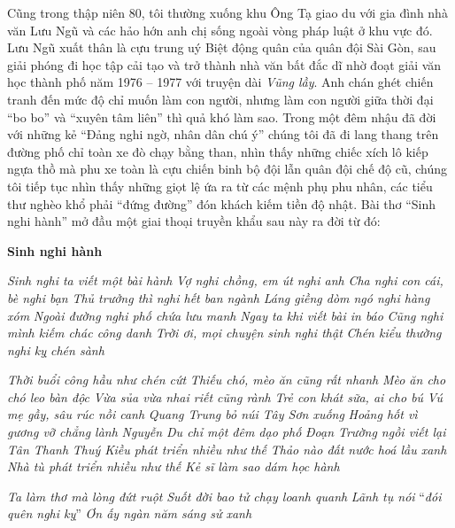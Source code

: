 \documentclass[../main.tex]{subfiles}
\begin{document}
\begin{multicols}{2}
Cũng trong thập niên 80, tôi thường xuống khu Ông Tạ giao du với gia đình nhà văn Lưu Ngũ và các hảo hớn anh chị sống ngoài vòng pháp luật ở khu vực đó. Lưu Ngũ xuất thân là cựu trung uý Biệt động quân của quân đội Sài Gòn, sau giải phóng đi học tập cải tạo và trở thành nhà văn bất đắc dĩ nhờ đoạt giải văn học thành phố năm 1976 – 1977 với truyện dài \textit{Vũng lầy}. Anh chán ghét chiến tranh đến mức độ chỉ muốn làm con người, nhưng làm con người giữa thời đại “bo bo” và “xuyên tâm liên” thì quả khó làm sao. Trong một đêm nhậu đã đời với những kẻ “Ðảng nghi ngờ, nhân dân chú ý” chúng tôi đã đi lang thang trên đường phố chỉ toàn xe đò chạy bằng than, nhìn thấy những chiếc xích lô kiếp ngựa thồ mà phu xe toàn là cựu chiến binh bộ đội lẫn quân đội chế độ cũ, chúng tôi tiếp tục nhìn thấy những giọt lệ ứa ra từ các mệnh phụ phu nhân, các tiểu thư nghèo khổ phải “đứng đường” đón khách kiếm tiền độ nhật. Bài thơ “Sinh nghi hành” mở đầu một giai thoại truyền khẩu sau này ra đời từ đó: 
\begin{blockquote}
 
\textbf{Sinh nghi hành} 
        
\textit{Sinh nghi ta viết một bài hành}        
\textit{Vợ nghi chồng, em út nghi anh}        
\textit{Cha nghi con cái, bè nghi bạn}        
\textit{Thủ trưởng thì nghi hết ban ngành}        
\textit{Láng giềng dòm ngó nghi hàng xóm}        
\textit{Ngoài đường nghi phố chứa lưu manh}        
\textit{Ngay ta khi viết bài in báo}        
\textit{Cũng nghi mình kiếm chác công danh}        
\textit{Trời ơi, mọi chuyện sinh nghi thật} 
\textit{Chén kiểu thường nghi kỵ chén sành} 
        
\textit{Thời buổi công hầu như chén cứt}        
\textit{Thiếu chó, mèo ăn cũng rất nhanh}        
\textit{Mèo ăn cho chó leo bàn độc}        
\textit{Vừa sủa vừa nhai riết cũng rành}        
\textit{Trẻ con khát sữa, ai cho bú}        
\textit{Vú mẹ gầy, sâu rúc nồi canh}        
\textit{Quang Trung bỏ núi Tây Sơn xuống}        
\textit{Hoảng hốt vì gương vỡ chẳng lành}        
\textit{Nguyễn Du chỉ một đêm dạo phố}        
\textit{Ðoạn Trường ngồi viết lại Tân Thanh}        
\textit{Thuý Kiều phát triển nhiều như thế}        
\textit{Thảo nào đất nước hoá lầu xanh}        
\textit{Nhà tù phát triển nhiều như thế} 
\textit{Kẻ sĩ làm sao dám học hành} 
        
\textit{Ta làm thơ mà lòng đứt ruột}        
\textit{Suốt đời bao tử chạy loanh quanh}        
\textit{Lãnh tụ nói }“\textit{đói quên nghi kỵ}” 
\textit{Ơn ấy ngàn năm sáng sử xanh} 


\end{blockquote}
\end{multicols}
\end{document}
